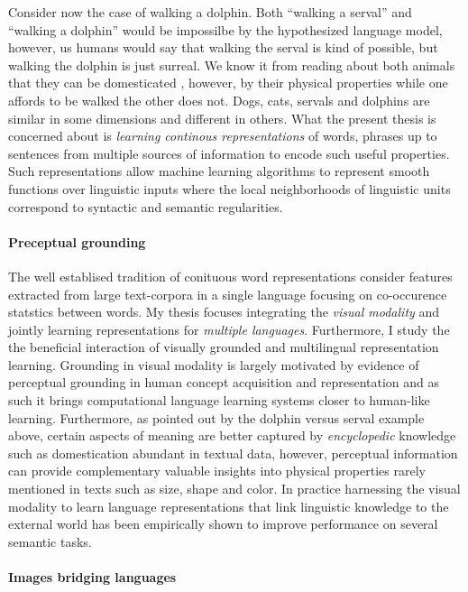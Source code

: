 Consider now the case of walking a dolphin.
Both ``walking a serval'' and ``walking a dolphin'' would be impossilbe
by the hypothesized language model, however, us humans would say that walking the serval is
kind of possible, but walking the dolphin is just surreal.
We know it from reading about both animals that they can be domesticated
, however, by their physical properties while one affords to be walked
the other does not. Dogs, cats, servals and dolphins are similar in some
dimensions and different in others.
What the present thesis is concerned about is
\emph{learning continous representations} of words, phrases up to sentences
from multiple sources of information to encode such useful properties.
Such representations allow machine learning algorithms to represent smooth
functions over linguistic inputs where the local neighborhoods of linguistic
units correspond to syntactic and semantic regularities.

\paragraph{Preceptual grounding}

The well establised tradition of conituous word representations consider
features extracted from large text-corpora in a single language focusing on
co-occurence statstics between words.
My thesis focuses integrating the \emph{visual modality} and jointly learning representations for
\emph{multiple languages}. Furthermore, I study the the beneficial interaction of
visually grounded and multilingual representation learning.
Grounding in visual modality is largely motivated by evidence of
perceptual grounding in human concept acquisition and representation \cite{barsalou2003grounding} and as such
it brings computational language learning systems closer to human-like learning.
Furthermore, as pointed out by the dolphin versus serval example above,
certain aspects of meaning are better captured by \emph{encyclopedic}
knowledge such as domestication abundant in textual data, however, perceptual information
can provide complementary valuable insights into physical properties rarely mentioned in texts such as size,
shape and color. In practice harnessing the visual modality to learn language
representations that link linguistic knowledge
to the external world \cite{kiela2014improving,baroni2016grounding,elliott2017imagination,kiela2017learning,yoo2017improving}
has been empirically shown to improve performance on several semantic tasks.

\paragraph{Images bridging languages}

